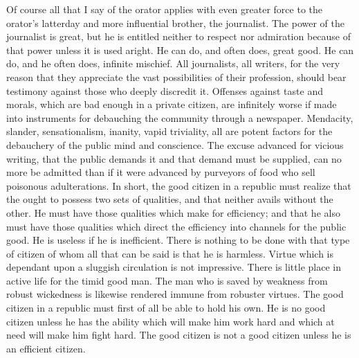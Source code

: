 \documentclass{scrbook}
\begin{document}
Of course all that I say of the orator applies with even greater force to the orator’s latterday and more influential brother, the journalist. The power of the journalist is great, but he
is entitled neither to respect nor admiration because of that power unless it is used aright.
He can do, and often does, great good. He can do, and he often does, infinite mischief.
All journalists, all writers, for the very reason that they appreciate the vast possibilities
of their profession, should bear testimony against those who deeply discredit it. Offenses
against taste and morals, which are bad enough in a private citizen, are infinitely worse
if made into instruments for debauching the community through a newspaper. Mendacity,
slander, sensationalism, inanity, vapid triviality, all are potent factors for the debauchery of
the public mind and conscience. The excuse advanced for vicious writing, that the public
demands it and that demand must be supplied, can no more be admitted than if it were
advanced by purveyors of food who sell poisonous adulterations. In short, the good citizen
in a republic must realize that the ought to possess two sets of qualities, and that neither
avails without the other. He must have those qualities which make for efficiency; and that
he also must have those qualities which direct the efficiency into channels for the public
good. He is useless if he is inefficient. There is nothing to be done with that type of citizen
of whom all that can be said is that he is harmless. Virtue which is dependant upon a
sluggish circulation is not impressive. There is little place in active life for the timid good
man. The man who is saved by weakness from robust wickedness is likewise rendered
immune from robuster virtues. The good citizen in a republic must first of all be able to
hold his own. He is no good citizen unless he has the ability which will make him work
hard and which at need will make him fight hard. The good citizen is not a good citizen
unless he is an efficient citizen.
\end{document}
